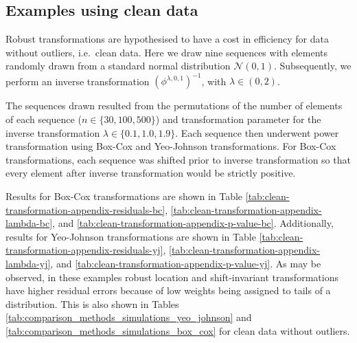 \documentclass[
  a4paper,
]{article}
\begin{document}
\begin{table}
\begin{center}
\begin{tabular}{l | l r r r r r r}
\bottomrule
\end{tabular}
\end{center}
\end{table}

\FloatBarrier

\subsection{Examples using clean data}\label{examples-using-clean-data}

Robust transformations are hypothesised to have a cost in efficiency for
data without outliers, i.e.~clean data. Here we draw nine sequences with
elements randomly drawn from a standard normal distribution
\(\mathcal{N}(0,1)\). Subsequently, we perform an inverse transformation
\(\left(\phi^{\lambda, 0, 1}\right)^{-1}\), with
\(\lambda \in \left(0, 2\right)\).

The sequences drawn resulted from the permutations of the number of
elements of each sequence (\(n \in \{30, 100, 500\}\)) and
transformation parameter for the inverse transformation
\(\lambda \in \{0.1, 1.0, 1.9\}\). Each sequence then underwent power
transformation using Box-Cox and Yeo-Johnson transformations. For
Box-Cox transformations, each sequence was shifted prior to inverse
transformation so that every element after inverse transformation would
be strictly positive.

Results for Box-Cox transformations are shown in Table
\ref{tab:clean-transformation-appendix-residuals-bc},
\ref{tab:clean-transformation-appendix-lambda-bc}, and
\ref{tab:clean-transformation-appendix-p-value-bc}. Additionally,
results for Yeo-Johnson transformations are shown in Table
\ref{tab:clean-transformation-appendix-residuals-yj},
\ref{tab:clean-transformation-appendix-lambda-yj}, and
\ref{tab:clean-transformation-appendix-p-value-yj}. As may be observed,
in these examples robust location and shift-invariant transformations
have higher residual errors because of low weights being assigned to
tails of a distribution. This is also shown in Tables
\ref{tab:comparison_methods_simulations_yeo_johnson} and
\ref{tab:comparison_methods_simulations_box_cox} for clean data without
outliers.
\end{document}
